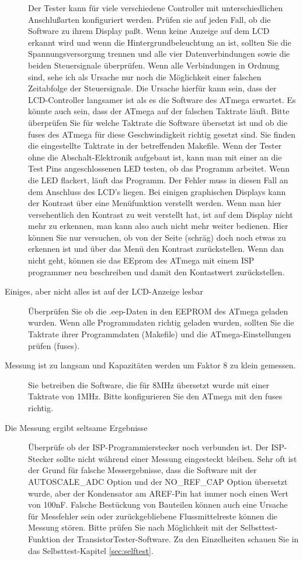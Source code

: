 \begin{description}
Der Tester kann für viele verschiedene Controller mit unterschiedlichen Anschlußarten
konfiguriert werden. Prüfen sie auf jeden Fall, ob die Software zu ihrem Display paßt.
Wenn keine Anzeige auf dem LCD erkannt wird und wenn die Hintergrundbeleuchtung an ist,
sollten Sie die Spannungsversorgung trennen und alle vier Datenverbindungen sowie die 
beiden Steuersignale überprüfen.
Wenn alle Verbindungen in Ordnung sind, sehe ich als Ursache nur noch die Möglichkeit einer
falschen Zeitabfolge der Steuersignale.
Die Ursache hierfür kann sein, dass der LCD-Controller langsamer ist als es die Software
des ATmega erwartet. Es könnte auch sein, dass der ATmega auf der falschen Taktrate läuft.
Bitte überprüfen Sie für welche Taktrate die Software übersetzt ist und ob
die fuses des ATmega für diese Geschwindigkeit richtig gesetzt sind.
Sie finden die eingestellte Taktrate in der betreffenden Makefile.
Wenn der Tester ohne die Abschalt-Elektronik aufgebaut ist, kann man mit einer
an die Test Pins angeschlossenen LED testen, ob das Programm arbeitet.
Wenn die LED flackert, läuft das Programm. Der Fehler muss in diesen Fall an
dem Anschluss des LCD's liegen. 
Bei einigen graphischen Displays kann der Kontrast über eine Menüfunktion verstellt werden.
Wenn man hier versehentlich den Kontrast zu weit verstellt hat, ist auf dem Display
nicht mehr zu erkennen, man kann also auch nicht mehr weiter bedienen.
Hier können Sie nur versuchen, ob von der Seite (schräg) doch noch etwas zu erkennen ist
und über das Menü den Kontrast zurückstellen. Wenn dan nicht geht, können sie
das EEprom des ATmega mit einem ISP programmer neu beschreiben und damit den Kontastwert zurückstellen.
\item[Einiges, aber nicht alles ist auf der LCD-Anzeige lesbar] 
Überprüfen Sie ob die .eep-Daten in den EEPROM des ATmega geladen wurden.
Wenn alle Programmdaten richtig geladen wurden, sollten Sie die Taktrate ihrer
Programmdaten (Makefile) und die ATmega-Einstellungen prüfen (fuses).

\item[Messung ist zu langsam und Kapazitäten werden um Faktor 8 zu klein gemessen.] 
Sie betreiben die Software, die für 8MHz übersetzt wurde mit einer Taktrate von 1MHz.
Bitte konfigurieren Sie den ATmega mit den fuses richtig.

\item[Die Messung ergibt seltsame Ergebnisse]  
Überprüfe ob der ISP-Programmierstecker noch verbunden ist.
Der ISP-Stecker sollte nicht während einer Messung eingesteckt bleiben.
Sehr oft ist der Grund für falsche Messergebnisse, dass die Software mit der
 AUTOSCALE\_ADC Option und der NO\_REF\_CAP Option übersetzt wurde, aber der
Kondensator am AREF-Pin hat immer noch einen Wert von 100nF.
Falsche Bestückung von Bauteilen können auch eine Ursache für Messfehler sein 
oder zurückgebliebene Flussmittelreste können die Messung stören.
Bitte prüfen Sie nach Möglichkeit mit der Selbsttest-Funktion der
TransistorTester-Software.
Zu den Einzelheiten schauen Sie in das Selbsttest-Kapitel \ref{sec:selftest}.


\end{description}
